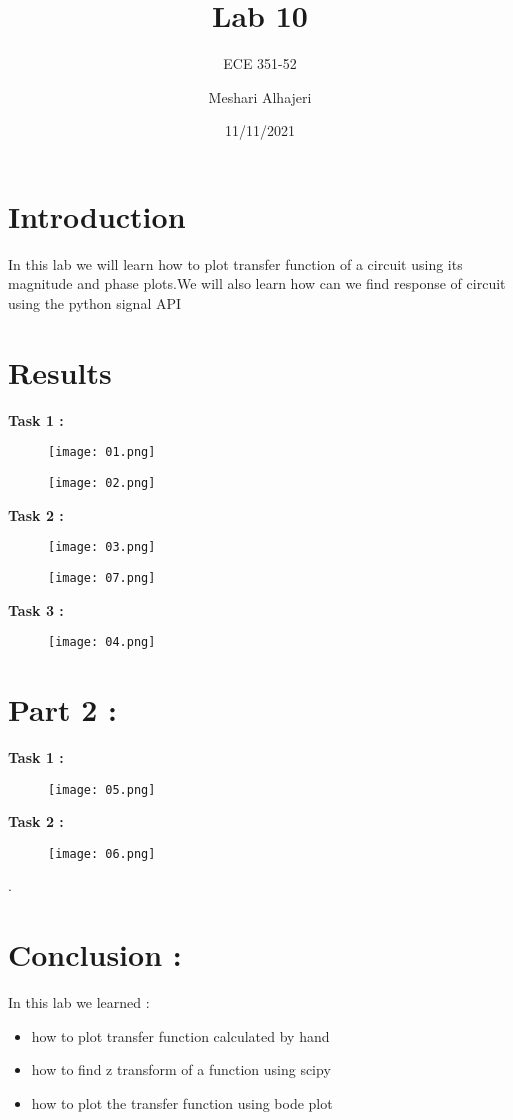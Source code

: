 \documentclass{article}
\title{Lab 10}
\author{ECE 351-52}
\author{Meshari Alhajeri}
\date{11/11/2021}
\begin{document}
\maketitle

\section{Introduction}
In this lab we will learn how to plot transfer function of a circuit using its magnitude and phase plots.We will also learn how can we find response of circuit using the python signal API
\section{Results}

\textbf{Task 1 :}
\begin{figure}[H]
\centering
\texttt{[image: 01.png]}
\label{fig:my_label}
\end{figure}
\begin{figure}[H]
\centering
\texttt{[image: 02.png]}
\label{fig:my_label}
\end{figure}


\textbf{Task 2 :}
\begin{figure}[H]
\centering
\texttt{[image: 03.png]}
\label{fig:my_label}
\end{figure}
\begin{figure}[H]
\centering
\texttt{[image: 07.png]}
\label{fig:my_label}
\end{figure}

\textbf{Task 3 :}
\begin{figure}[H]
\centering
\texttt{[image: 04.png]}
\label{fig:my_label}
\end{figure}
\section*{Part 2 :}
\textbf{Task 1 :}
\begin{figure}[H]
\centering
\texttt{[image: 05.png]}
\label{fig:my_label}
\end{figure}

\textbf{Task 2 :}
\begin{figure}[H]
\centering
\texttt{[image: 06.png]}
\label{fig:my_label}
\end{figure}
.

\section{Conclusion :}
In this lab we learned :
\begin{itemize}
\item how to plot transfer function calculated by hand
\item how to find z transform of a function using scipy
\item how to plot the transfer function using bode plot
\end{itemize}
\end{document}
